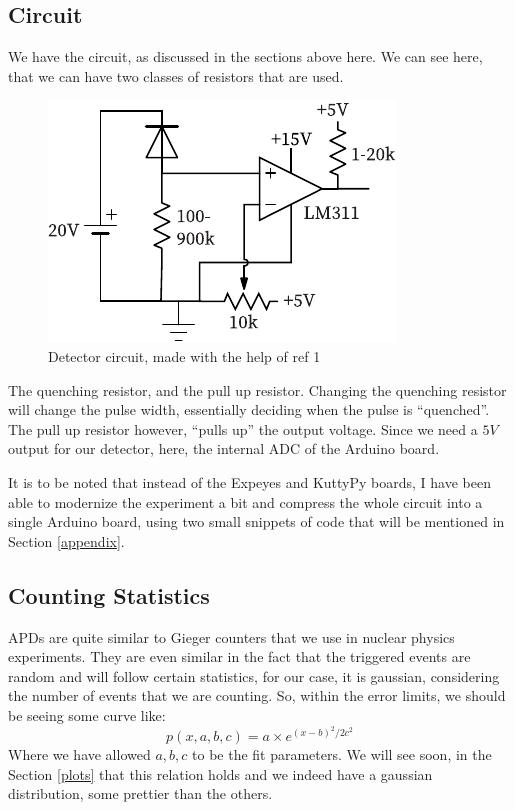 \documentclass{double}
\begin{document}
\begin{multicols*}{2}
\subsection{Circuit}
We have the circuit, as discussed in the sections above here. We can see here, that we can have two classes of resistors that are used. 
\begin{figure}[H]
	\centering
	\includegraphics[width=0.6\columnwidth]{images/circuit.pdf}
	\caption{Detector circuit, made with the help of ref 1}
\end{figure}
The quenching resistor, and the pull up resistor. Changing the quenching resistor will change the pulse width, essentially deciding when the pulse is ``quenched''. The pull up resistor however, ``pulls up'' the output voltage. Since we need a $5\si{V}$ output for our detector, here, the internal ADC of the Arduino board.

It is to be noted that instead of the Expeyes and KuttyPy boards, I have been able to modernize the experiment a bit and compress the whole circuit into a single Arduino board, using two small snippets of code that will be mentioned in Section \ref{appendix}.

\subsection{Counting Statistics}
APDs are quite similar to Gieger counters that we use in nuclear physics experiments. They are even similar in the fact that the triggered events are random and will follow certain statistics, for our case, it is gaussian, considering the number of events that we are counting. So, within the error limits, we should be seeing some curve like:
\begin{equation}
	p(x,a,b,c) = a \times e^{(x-b)^2 / 2c^2}
\end{equation}
Where we have allowed $a, b, c$ to be the fit parameters. We will see soon, in the Section \ref{plots} that this relation holds and we indeed have a gaussian distribution, some prettier than the others.


\end{multicols*}
\end{document}
